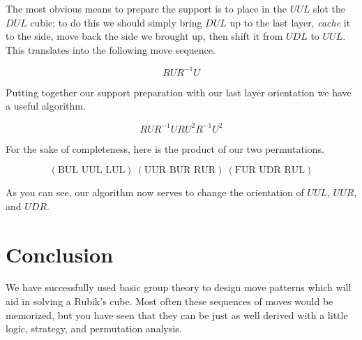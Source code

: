 \documentclass{article}
\begin{document}
The most obvious means to prepare the support is to place in the $UUL$ slot 
the $DUL$ cubie; to do this we should simply bring $DUL$ up to the last 
layer, \emph{cache} it to the side, move back the side we brought up, then 
shift it from $UDL$ to $UUL$. This translates into the following move 
sequence.

$$R U R^{-1} U$$

Putting together our support preparation with our last layer orientation we 
have a useful algorithm.

$$R U R^{-1} U R U^2 R^{-1} U^2$$

For the sake of completeness, here is the product of our two permutations.

$$(\text{BUL UUL LUL})\ (\text{UUR BUR RUR})\ (\text{FUR UDR RUL})$$

As you can see, our algorithm now serves to change the orientation of $UUL$, 
$UUR$, and $UDR$.

\section{Conclusion}
We have successfully used basic group theory to design move patterns which 
will aid in solving a Rubik's cube. Most often these sequences of moves would 
be memorized, but you have seen that they can be just as well derived with a 
little logic, strategy, and permutation analysis.
\end{document}
